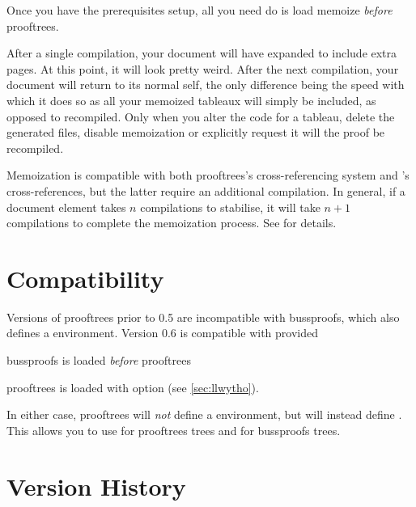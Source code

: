 \documentclass[10pt,british,a4paper,doc2]{ltxdoc}
\newcommand*\pkg[1]{\textsf{#1}}
\begin{document}
Once you have the prerequisites setup, all you need do is load \pkg{memoize} \emph{before} \pkg{prooftrees}.

\begin{latexcode}
\usepackage[extraction method=perl]{memoize}%
\usepackage{prooftrees}
\end{latexcode}

After a single compilation, your document will have expanded to include extra pages.
At this point, it will look pretty weird.
After the next compilation, your document will return to its normal self, the only difference being the speed with which it does so as all your memoized tableaux will simply be included, as opposed to recompiled.
Only when you alter the code for a tableau, delete the generated files, disable memoization or explicitly request it will the proof be recompiled.

Memoization is compatible with both \pkg{prooftrees}'s cross-referencing system and \LaTeXe's cross-references, but the latter require an additional compilation.
In general, if a document element takes $n$ compilations to stabilise, it will take $n+1$ compilations to complete the memoization process.
See  \autocite{saso-memoize-manual} for details.


\section{Compatibility}\label{sec:compat}

Versions of \pkg{prooftrees} prior to 0.5 are incompatible with \pkg{bussproofs}, which also defines a  environment.
Version 0.6 is compatible with  provided
\begin{description}[font=\itshape]
  \item[either] \pkg{bussproofs} is loaded \emph{before} \pkg{prooftrees}
  \item[or] \pkg{prooftrees} is loaded with option  (see \cref{sec:llwytho}).
\end{description}
In either case, \pkg{prooftrees} will \emph{not} define a  environment, but will instead define .
This allows you to use  for \pkg{prooftrees} trees and  for \pkg{bussproofs} trees.


\section{Version History}\label{sec:hanes}
\end{document}
